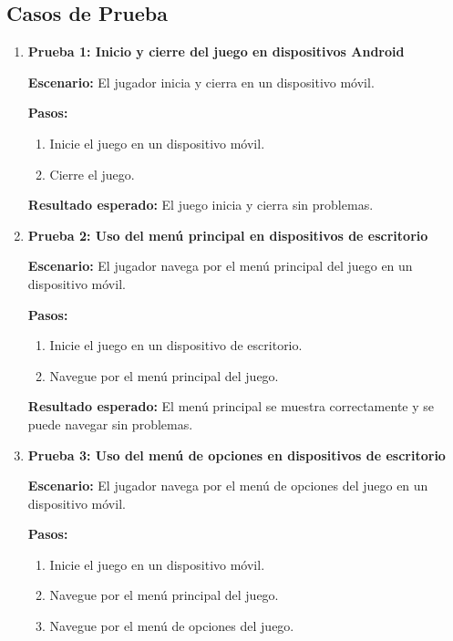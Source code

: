 \subsection{Casos de Prueba}
\begin{enumerate}
	\item \textbf{Prueba 1: Inicio y cierre del juego en dispositivos Android}

	      \textbf{Escenario:} El jugador inicia y cierra en un dispositivo móvil.

	      \textbf{Pasos:}
	      \begin{enumerate}
		      \item Inicie el juego en un dispositivo móvil.
		      \item Cierre el juego.
	      \end{enumerate}

	      \textbf{Resultado esperado:} El juego inicia y cierra sin problemas.

	\item \textbf{Prueba 2: Uso del menú principal en dispositivos de escritorio}

	      \textbf{Escenario:} El jugador navega por el menú principal del juego en un dispositivo móvil.

	      \textbf{Pasos:}
	      \begin{enumerate}
		      \item Inicie el juego en un dispositivo de escritorio.
		      \item Navegue por el menú principal del juego.
	      \end{enumerate}

	      \textbf{Resultado esperado:} El menú principal se muestra correctamente y se puede navegar sin problemas.

	\item \textbf{Prueba 3: Uso del menú de opciones en dispositivos de escritorio}

	      \textbf{Escenario:} El jugador navega por el menú de opciones del juego en un dispositivo móvil.

	      \textbf{Pasos:}
	      \begin{enumerate}
		      \item Inicie el juego en un dispositivo móvil.
		      \item Navegue por el menú principal del juego.
		      \item Navegue por el menú de opciones del juego.
	      \end{enumerate}


\end{enumerate}

